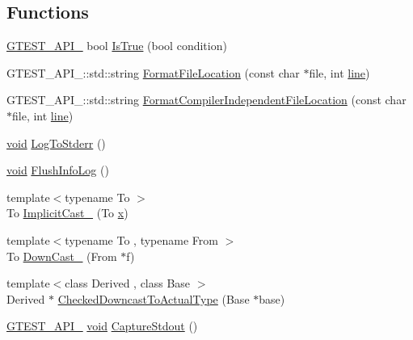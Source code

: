 \subsection*{Functions}
\begin{DoxyCompactItemize}
\item 
\hyperlink{ts__gtest_8h_aa73be6f0ba4a7456180a94904ce17790}{G\-T\-E\-S\-T\-\_\-\-A\-P\-I\-\_\-} bool \hyperlink{namespacetesting_1_1internal_ab2709373c78eb8b1c22a6ba30cceba52}{Is\-True} (bool condition)
\item 
G\-T\-E\-S\-T\-\_\-\-A\-P\-I\-\_\-\-::std\-::string \hyperlink{namespacetesting_1_1internal_aea0ca448425df26e868a7d9447b9b7a1}{Format\-File\-Location} (const char $\ast$file, int \hyperlink{legacy_8hpp_a5a869825573cfaf8861a6ec0fe0f262f}{line})
\item 
G\-T\-E\-S\-T\-\_\-\-A\-P\-I\-\_\-\-::std\-::string \hyperlink{namespacetesting_1_1internal_a882004bab0e3f0d1e9c913ae4e7fae50}{Format\-Compiler\-Independent\-File\-Location} (const char $\ast$file, int \hyperlink{legacy_8hpp_a5a869825573cfaf8861a6ec0fe0f262f}{line})
\item 
\hyperlink{legacy_8hpp_a8bb47f092d473522721002c86c13b94e}{void} \hyperlink{namespacetesting_1_1internal_a06b1b20029fbd1dbeb59752f914fab84}{Log\-To\-Stderr} ()
\item 
\hyperlink{legacy_8hpp_a8bb47f092d473522721002c86c13b94e}{void} \hyperlink{namespacetesting_1_1internal_a2135f223bf6b527729aeaa651115183b}{Flush\-Info\-Log} ()
\item 
{\footnotesize template$<$typename To $>$ }\\To \hyperlink{namespacetesting_1_1internal_a982df3f369643b175f79cda4048bc3b9}{Implicit\-Cast\-\_\-} (To \hyperlink{highgui__c_8h_a6150e0515f7202e2fb518f7206ed97dc}{x})
\item 
{\footnotesize template$<$typename To , typename From $>$ }\\To \hyperlink{namespacetesting_1_1internal_a1a1a1aed3fe00908b8a45d5ab4a33665}{Down\-Cast\-\_\-} (From $\ast$f)
\item 
{\footnotesize template$<$class Derived , class Base $>$ }\\Derived $\ast$ \hyperlink{namespacetesting_1_1internal_abfe9bfb020d38aa4e0e12c001911b22b}{Checked\-Downcast\-To\-Actual\-Type} (Base $\ast$base)
\item 
\hyperlink{ts__gtest_8h_aa73be6f0ba4a7456180a94904ce17790}{G\-T\-E\-S\-T\-\_\-\-A\-P\-I\-\_\-} \hyperlink{legacy_8hpp_a8bb47f092d473522721002c86c13b94e}{void} \hyperlink{namespacetesting_1_1internal_acba06d4f0343dec407738ba5544af990}{Capture\-Stdout} ()

\end{DoxyCompactItemize}
